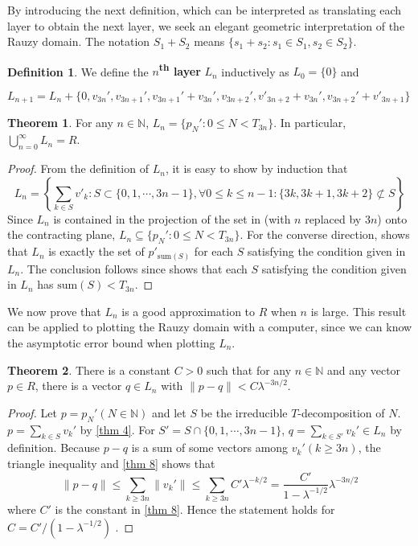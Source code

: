 \documentclass{article}
\theoremstyle{definition}
\newtheorem{theorem}{Theorem}
\newtheorem*{definition}{Definition}
\begin{document}
By introducing the next definition, which can be interpreted as translating each layer to obtain the next layer, we seek an elegant geometric interpretation of the Rauzy domain. The notation $S_1+S_2$ means $\{s_1+s_2:s_1\in S_1,  s_2\in S_2\}$.


\begin{definition}
    We define the \textbf{$n$\textsuperscript{th} layer} $L_n$ inductively as $L_0=\{0\}$ and
    \begin{center}
        $L_{n+1}=L_n+\{0, v_{3n}', v_{3n+1}', v_{3n+1}'+v_{3n}',v_{3n+2}', v'_{3n+2}+v_{3n}',v_{3n+2}'+v'_{3n+1}\}$
    \end{center}
\end{definition}
\begin{theorem}
\label{thm 10}
For any $n\in \mathbb{N}$, $L_n=\{p_N':0\leq N< T_{3n}\}$. In particular, $\bigcup_{n=0}^\infty L_n=R$.
\end{theorem}
\begin{proof}
    From the definition of $L_n$, it is easy to show by induction that \[
    L_n=\left\{\sum_{k\in S}v'_k : S\subset\{0,1,\cdots,3n-1\}, \forall 0\leq k\leq n-1:\{3k, 3k+1, 3k+2\} \not\subset S \right\}
    \]
    Since $L_n$ is contained in the projection of the set in  (with $n$ replaced by $3n$) onto the contracting plane, $L_n\subseteq \{p_N':0\leq N< T_{3n}\}$. For the converse direction,  shows that $L_n$ is exactly the set of $p'_{\text{sum}(S)}$ for each $S$ satisfying the condition given in $L_n$. The conclusion follows since  shows that each $S$ satisfying the condition given in $L_n$ has $\text{sum}(S)<T_{3n}$. 
\end{proof}

We now prove that $L_n$ is a good approximation to $R$ when $n$ is large. This result can be applied to plotting the Rauzy domain with a computer, since we can know the asymptotic error bound when plotting $L_n$.

\begin{theorem}
\label {thm 11}
There is a constant $C>0$ such that for any $n\in\mathbb{N}$ and any vector $p\in R$, there is a vector $q\in L_n$ with $\| p-q\|<C\lambda^{-3n/2}$.
\end{theorem}

\begin{proof}
Let $p=p_N'(N\in\mathbb{N})$ and let $S$ be the irreducible $T$-decomposition of $N$. $p=\sum_{k\in S}v_k'$ by \cref{thm 4}. For $S'=S\cap\{0,1,\cdots,3n-1\}$, $q=\sum_{k\in S'}v_k'\in L_n$ by definition. Because $p-q$ is a sum of some vectors among $v_{k}'(k\geq 3n)$, the triangle inequality and \cref{thm 8} shows that
\[
\|p-q\|\leq\sum_{k\geq 3n}\|v_k' \|\leq\sum_{k\geq 3n}C'\lambda^{-k/2}=\frac{C'}{1-\lambda^{-1/2}}\lambda^{-3n/2}
\]
where $C'$ is the constant in \cref{thm 8}. Hence the statement holds for $C=C'/(1-\lambda^{-1/2})$ .
\end{proof}
\end{document}
